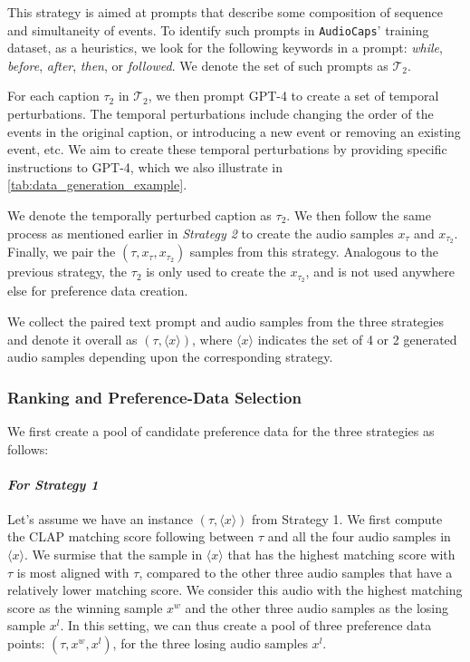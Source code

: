 This strategy is aimed at prompts that describe some composition of sequence and simultaneity of events. To identify such prompts in \texttt{AudioCaps}' training dataset, as a heuristics, we look for the following keywords in a prompt: \emph{while}, \emph{before}, \emph{after}, \emph{then}, or \emph{followed}. We denote the set of such prompts as $\mathcal{T}_2$.

For each caption $\tau_2$ in $\mathcal{T}_2$, we then prompt GPT-4 to create a set of temporal perturbations. The temporal perturbations include changing the order of the events in the original caption, or introducing a new event or removing an existing event, etc. We aim to create these temporal perturbations by providing specific instructions to GPT-4, which we also illustrate in \cref{tab:data_generation_example}. 

We denote the temporally perturbed caption as $\tau_2$. We then follow the same process as mentioned earlier in \textit{Strategy 2} to create the audio samples $x_{\tau}$ and $x_{\tau_2}$. Finally, we pair the $(\tau, x_{\tau}, x_{\tau_2})$ samples from this strategy. Analogous to the previous strategy, the $\tau_2$ is only used to create the $x_{\tau_2}$, and is not used anywhere else for preference data creation. 

We collect the paired text prompt and audio samples from the three strategies and denote it overall as $(\tau, \langle x \rangle)$, where $\langle x \rangle$ indicates the set of 4 or 2 generated audio samples depending upon the corresponding strategy. 

\subsubsection{Ranking and Preference-Data Selection}
\label{sec:audio_alpaca_creation}
We first create a pool of candidate preference data for the three strategies as follows:

\paragraph{\bf \textit{For Strategy 1}} Let's assume we have an instance $(\tau, \langle x \rangle)$ from Strategy 1. 
We first compute the CLAP matching score following \citet{wu2023large} between $\tau$ and all the four audio samples in $\langle x \rangle$. We surmise that the sample in $\langle x \rangle$ that has the highest matching score with $\tau$ is most aligned with $\tau$, compared to the other three audio samples that have a relatively lower matching score. We consider this audio with the highest matching score as the winning sample $x^w$ and the other three audio samples as the losing sample $x^l$. In this setting, we can thus create a pool of three preference data points: $(\tau, x^w, x^l)$, for the three losing audio samples $x^l$.

